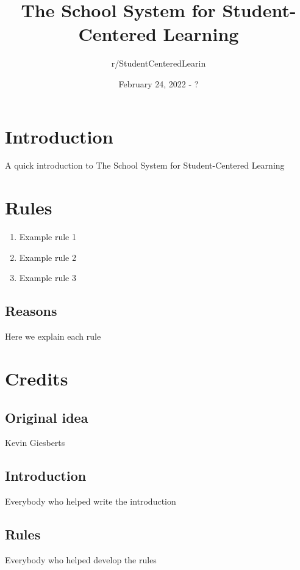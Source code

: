 \documentclass[titlepage]{article}
\author{r/StudentCenteredLearin}
\title{The School System for Student-Centered Learning}
\date{February 24, 2022 - ?}
\begin{document}
\maketitle
\newpage
\tableofcontents
\newpage
\section{Introduction}
A quick introduction to The School System for Student-Centered Learning

\newpage
\section{Rules}
\begin{enumerate}
	\item Example rule 1
	\item Example rule 2
	\item Example rule 3
\end{enumerate}
\subsection{Reasons}
Here we explain each rule

\newpage
\section{Credits}
\subsection{Original idea}
Kevin Giesberts
\subsection{Introduction}
Everybody who helped write the introduction
\subsection{Rules}
Everybody who helped develop the rules
\end{document}
